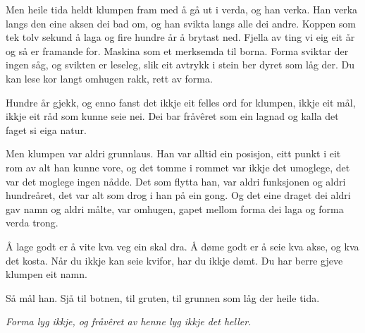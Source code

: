 \documentclass[11pt]{article}
\begin{document}
Men heile tida heldt klumpen fram med å gå ut i verda, og han verka. Han verka langs den eine aksen dei bad om, og han svikta langs alle dei andre. Koppen som tek tolv sekund å laga og fire hundre år å brytast ned. Fjella av ting vi eig eit år og så er framande for. Maskina som et merksemda til borna. Forma sviktar der ingen såg, og svikten er leseleg, slik eit avtrykk i stein ber dyret som låg der. Du kan lese kor langt omhugen rakk, rett av forma.

Hundre år gjekk, og enno fanst det ikkje eit felles ord for klumpen, ikkje eit mål, ikkje eit råd som kunne seie nei. Dei bar fråvêret som ein lagnad og kalla det faget si eiga natur.

Men klumpen var aldri grunnlaus. Han var alltid ein posisjon, eitt punkt i eit rom av alt han kunne vore, og det tomme i rommet var ikkje det umoglege, det var det moglege ingen nådde. Det som flytta han, var aldri funksjonen og aldri hundreåret, det var alt som drog i han på ein gong. Og det eine draget dei aldri gav namn og aldri målte, var omhugen, gapet mellom forma dei laga og forma verda trong.

Å lage godt er å vite kva veg ein skal dra. Å døme godt er å seie kva akse, og kva det kosta. Når du ikkje kan seie kvifor, har du ikkje dømt. Du har berre gjeve klumpen eit namn.

\medskip

Så mål han. Sjå til botnen, til gruten, til grunnen som låg der heile tida.

{\itshape Forma lyg ikkje, og fråvêret av henne lyg ikkje det heller.}
\end{document}
